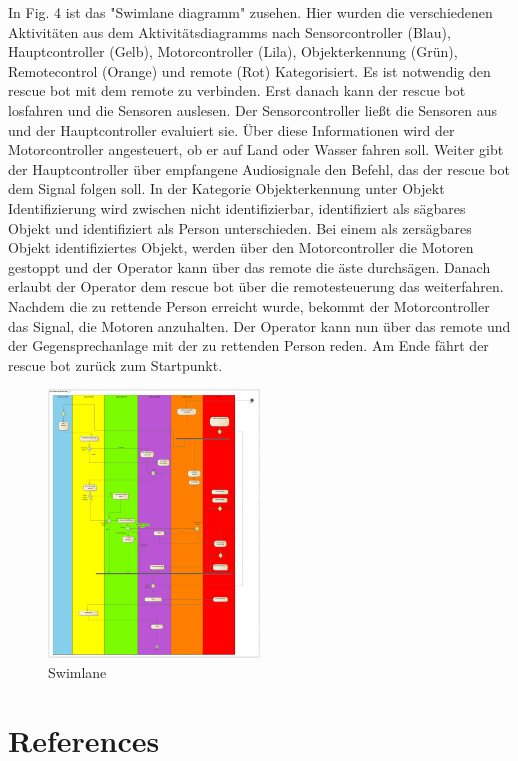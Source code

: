 \documentclass[conference]{IEEEtran}
\begin{document}
In Fig. 4 ist das "Swimlane diagramm" zusehen. Hier wurden die verschiedenen Aktivitäten aus dem Aktivitätsdiagramms nach Sensorcontroller (Blau), Hauptcontroller (Gelb), Motorcontroller (Lila), Objekterkennung (Grün), Remotecontrol (Orange) und remote (Rot) Kategorisiert. Es ist notwendig den rescue bot mit dem remote zu verbinden. Erst danach kann der rescue bot losfahren und die Sensoren auslesen.
Der Sensorcontroller ließt die Sensoren aus und der Hauptcontroller evaluiert sie. Über diese Informationen wird der Motorcontroller angesteuert, ob er auf Land oder Wasser fahren soll. Weiter gibt der Hauptcontroller über empfangene Audiosignale den Befehl, das der rescue bot dem Signal folgen soll. In der Kategorie Objekterkennung unter Objekt Identifizierung wird zwischen nicht identifizierbar, identifiziert als sägbares Objekt und identifiziert als Person unterschieden. Bei einem als zersägbares Objekt identifiziertes Objekt, werden über den Motorcontroller die Motoren gestoppt und der Operator kann über das remote die äste durchsägen. Danach erlaubt der Operator dem rescue bot über die remotesteuerung das weiterfahren. Nachdem die zu rettende Person erreicht wurde, bekommt der Motorcontroller das Signal, die Motoren anzuhalten. Der Operator kann nun über das remote und der Gegensprechanlage mit der zu rettenden Person reden. Am Ende fährt der rescue bot zurück zum Startpunkt.  

\begin{figure}[htbp]
	\centering
	\includegraphics[width=0.5\textwidth]{Starter State Machine1}
	\caption{Swimlane}
	
\end{figure}



\section*{References}



\vspace{12pt}
\color{red}
\end{document}
